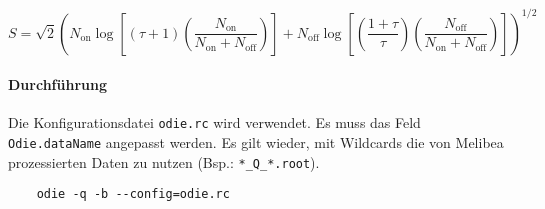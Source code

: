 \begin{equation}
	S = \sqrt{2} \left(
		N_\text{on} \log \left[
			(\tau + 1) \left( 
				\frac{N_\text{on}}{N_\text{on} + N_\text{off}} 
			\right)
		\right]  
		+ N_\text{off} \log \left[
			\left( \frac{1 + \tau}{\tau} \right) \left( 
				\frac{N_\text{off}}{N_\text{on} + N_\text{off}} 
			\right)
		\right]  
	\right) ^ {1/2}
\end{equation}


\paragraph{Durchführung}%

Die Konfigurationsdatei \texttt{odie.rc} wird verwendet.
Es muss das Feld \texttt{Odie.dataName} angepasst werden.
Es gilt wieder, mit Wildcards die von Melibea prozessierten Daten zu nutzen
(Bsp.: \texttt{*\_Q\_*.root}).

\begin{lstlisting}
	odie -q -b --config=odie.rc
\end{lstlisting}
